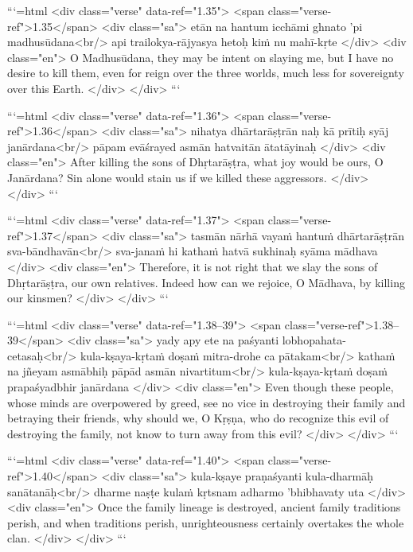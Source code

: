 ```{=html}
<div class="verse" data-ref="1.35">
  <span class="verse-ref">1.35</span>
  <div class="sa">
    etān na hantum icchāmi ghnato ’pi madhusūdana<br/>
    api trailokya-rājyasya hetoḥ kiṁ nu mahī-kṛte
  </div>
  <div class="en">
    O Madhusūdana, they may be intent on slaying me, but I have no desire to kill them, even for reign over the three worlds, much less for sovereignty over this Earth.
  </div>
</div>
```



```{=html}
<div class="verse" data-ref="1.36">
  <span class="verse-ref">1.36</span>
  <div class="sa">
    nihatya dhārtarāṣṭrān naḥ kā prītiḥ syāj janārdana<br/>
    pāpam evāśrayed asmān hatvaitān ātatāyinaḥ
  </div>
  <div class="en">
    After killing the sons of Dhṛtarāṣṭra, what joy would be ours, O Janārdana? Sin alone would stain us if we killed these aggressors.
  </div>
</div>
```



```{=html}
<div class="verse" data-ref="1.37">
  <span class="verse-ref">1.37</span>
  <div class="sa">
    tasmān nārhā vayaṁ hantuṁ dhārtarāṣṭrān sva-bāndhavān<br/>
    sva-janaṁ hi kathaṁ hatvā sukhinaḥ syāma mādhava
  </div>
  <div class="en">
    Therefore, it is not right that we slay the sons of Dhṛtarāṣṭra, our own relatives. Indeed how can we rejoice, O Mādhava, by killing our kinsmen?
  </div>
</div>
```



```{=html}
<div class="verse" data-ref="1.38–39">
  <span class="verse-ref">1.38–39</span>
  <div class="sa">
    yady apy ete na paśyanti lobhopahata-cetasaḥ<br/>
    kula-kṣaya-kṛtaṁ doṣaṁ mitra-drohe ca pātakam<br/>
    kathaṁ na jñeyam asmābhiḥ pāpād asmān nivartitum<br/>
    kula-kṣaya-kṛtaṁ doṣaṁ prapaśyadbhir janārdana
  </div>
  <div class="en">
    Even though these people, whose minds are overpowered by greed, see no vice in destroying their family and betraying their friends, why should we, O Kṛṣṇa, who do recognize this evil of destroying the family, not know to turn away from this evil?
  </div>
</div>
```



```{=html}
<div class="verse" data-ref="1.40">
  <span class="verse-ref">1.40</span>
  <div class="sa">
    kula-kṣaye praṇaśyanti kula-dharmāḥ sanātanāḥ<br/>
    dharme naṣṭe kulaṁ kṛtsnam adharmo ’bhibhavaty uta
  </div>
  <div class="en">
    Once the family lineage is destroyed, ancient family traditions perish, and when traditions perish, unrighteousness certainly overtakes the whole clan.
  </div>
</div>
```



